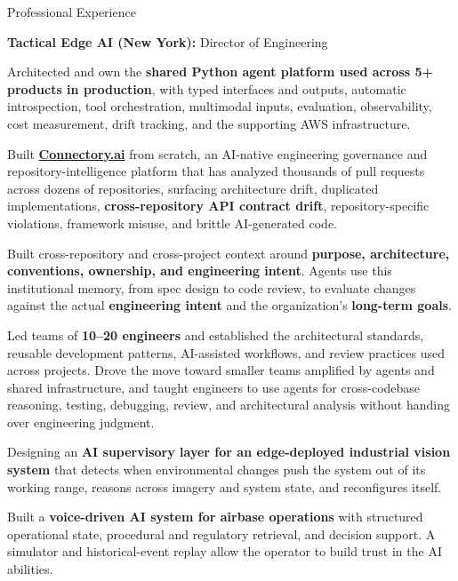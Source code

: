 \begin{rubric}{Professional Experience}

  \entry*[2025--Present]%
  \textbf{Tactical Edge AI (New York):} Director of Engineering
  \par
  \begin{cvitems}
    \item Architected and own the \textbf{shared Python agent platform used across 5+ products in production},
    with typed interfaces and outputs, automatic introspection, tool orchestration, multimodal inputs,
    evaluation, observability, cost measurement, drift tracking, and the supporting AWS infrastructure.
    \item Built \textbf{\href{https://connectory.ai}{Connectory.ai}} from scratch, an AI-native engineering
    governance and repository-intelligence platform that has analyzed thousands of pull requests across
    dozens of repositories, surfacing architecture drift, duplicated implementations,
    \textbf{cross-repository API contract drift}, repository-specific violations, framework misuse, and
    brittle AI-generated code.
    \item Built cross-repository and cross-project context around \textbf{purpose, architecture, conventions,
    ownership, and engineering intent}. Agents use this institutional memory, from spec design to code
    review, to evaluate changes against the actual \textbf{engineering intent} and the organization's
    \textbf{long-term goals}.
    \item Led teams of \textbf{10--20 engineers} and established the architectural standards, reusable
    development patterns, AI-assisted workflows, and review practices used across projects. Drove the move
    toward smaller teams amplified by agents and shared infrastructure, and taught engineers to use agents
    for cross-codebase reasoning, testing, debugging, review, and architectural analysis without handing
    over engineering judgment.
    \item Designing an \textbf{AI supervisory layer for an edge-deployed industrial vision system} that
    detects when environmental changes push the system out of its working range, reasons across imagery and
    system state, and reconfigures itself.
    \item Built a \textbf{voice-driven AI system for airbase operations} with structured operational state,
    procedural and regulatory retrieval, and decision support. A simulator and historical-event replay
    allow the operator to build trust in the AI abilities.
  \end{cvitems}


\end{rubric}
